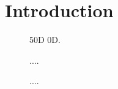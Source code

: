 \section{Introduction}
\lipsum[5]




\begin{figure}[h]
	\centering
    
	\caption{50D 0D.}
	\label{fig:controllerboardv2_}
\end{figure}

\begin{figure}[h]
	\centering
    
	\caption{....}
	\label{fig:controllerboardv2_}
\end{figure}


\begin{figure}[h]
	\centering
    
	\caption{....}
	\label{fig:controllerboardv2_}
\end{figure}
